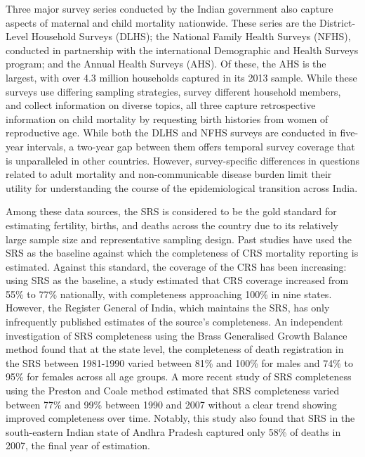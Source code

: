 \documentclass[
]{report}
\begin{document}
Three major survey series conducted by the Indian government also capture aspects of maternal and child mortality nationwide. These series are the District-Level Household Surveys (DLHS); the National Family Health Surveys (NFHS), conducted in partnership with the international Demographic and Health Surveys program; and the Annual Health Surveys (AHS). Of these, the AHS is the largest, with over 4.3 million households captured in its 2013 sample.\autocite{Dandona2016} While these surveys use differing sampling strategies, survey different household members, and collect information on diverse topics, all three capture retrospective information on child mortality by requesting birth histories from women of reproductive age.\autocite{Dandona2016} While both the DLHS and NFHS surveys are conducted in five-year intervals, a two-year gap between them offers temporal survey coverage that is unparalleled in other countries. However, survey-specific differences in questions related to adult mortality and non-communicable disease burden limit their utility for understanding the course of the epidemiological transition across India.\autocite{Yadav2014}

Among these data sources, the SRS is considered to be the gold standard for estimating fertility, births, and deaths across the country due to its relatively large sample size and representative sampling design.\autocite{Mahapatra2010} Past studies have used the SRS as the baseline against which the completeness of CRS mortality reporting is estimated.\autocite{Kumar2019} Against this standard, the coverage of the CRS has been increasing: using SRS as the baseline, a study estimated that CRS coverage increased from 55\% to 77\% nationally, with completeness approaching 100\% in nine states.\autocite{Kumar2019} However, the Register General of India, which maintains the SRS, has only infrequently published estimates of the source's completeness. An independent investigation of SRS completeness using the Brass Generalised Growth Balance method found that at the state level, the completeness of death registration in the SRS between 1981-1990 varied between 81\% and 100\% for males and 74\% to 95\% for females across all age groups.\autocite{Bhat2002} A more recent study of SRS completeness using the Preston and Coale method estimated that SRS completeness varied between 77\% and 99\% between 1990 and 2007 without a clear trend showing improved completeness over time. Notably, this study also found that SRS in the south-eastern Indian state of Andhra Pradesh captured only 58\% of deaths in 2007, the final year of estimation.\autocite{Mahapatra2010}
\end{document}
